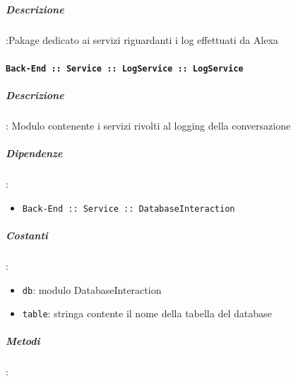 \documentclass[../DefinizioneDiProdotto_v3.0.0.tex]{subfiles}
\begin{document}
\subparagraph{Descrizione}:Pakage dedicato ai servizi riguardanti i log effettuati da Alexa

\paragraph{\texttt{Back-End :: Service :: LogService :: LogService}}
\subparagraph{Descrizione}: Modulo contenente i servizi rivolti al logging della conversazione
\subparagraph{Dipendenze}:
\begin{itemize}
	\item \texttt{Back-End :: Service :: DatabaseInteraction}
\end{itemize}
\subparagraph{Costanti}:
\begin{itemize}
	\item \texttt{db}: modulo DatabaseInteraction
	\item \texttt{table}: stringa contente il nome della tabella del database
\end{itemize}
\subparagraph{Metodi}:
\end{document}
